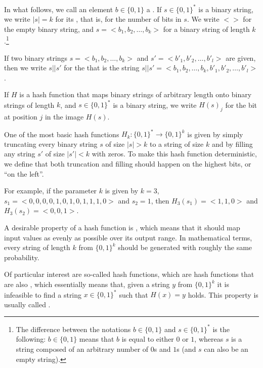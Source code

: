 \begin{notation}
\label{string_and_hash_notations}
In what follows, we call an element $b\in\{0,1\}$ a . If $s\in\{0,1\}^*$ is a binary string, we write $|s|=k$ for its , that is, for the number of bits in $s$. We write $<>$ for the empty binary string, and $s=<b_1,b_2,\ldots,b_k>$ for a binary string of length $k$.\footnote{The difference between the notations $b\in\{0,1\}$ and $s\in\{0,1\}^*$ is the following: $b\in\{0,1\}$ means that $b$ is equal to either $0$ or $1$, whereas $s$ is a string composed of an arbitrary number of $0$s and $1$s (and $s$ can also be an empty string).}

If two binary strings $s=<b_1,b_2,\ldots,b_k>$ and $s'=<b'_1,b'_2,\ldots,b'_l>$ are given, then we write $s||s'$ for the  that is the string 
$s||s'=<b_1,b_2,\ldots,b_k,b'_1,b'_2,\ldots,b'_l>$.

If $H$ is a hash function that maps binary strings of arbitrary length onto binary strings of length $k$, and $s\in\{0,1\}^*$ is a binary string, we write $H(s)_j$ for the bit at position $j$ in the image $H(s)$.
\end{notation}

\begin{example}\label{ex:k-truncation-hash} One of the most basic hash functions $H_k:\{0,1\}^*\to \{0,1\}^k$ is given by simply truncating every binary string $s$ of size $|s|> k$ to a string of size $k$ and by filling any string $s'$ of size $|s'|<k$ with zeros. To make this hash function deterministic, we define that both truncation and filling should happen on the highest bits, or ``on the left''.

For example, if the parameter $k$ is given by $k=3$, $s_1=<0,0,0,0,1,0,1,0,1,1,1,0>$ and $s_2=1$, then $H_3(s_1)=<1,1,0>$ and $H_3(s_2)=<0,0,1>$.
\end{example}

A desirable property of a hash function is , which means that it should map input values as evenly as possible over its output range. In mathematical terms, every string of length $k$  from $\{0,1\}^k$ should be generated with roughly the same probability.

Of particular interest are so-called  hash functions, which are hash functions that are also , which essentially means that, given a string $y$ from $\{0,1\}^k$ it is infeasible to find a string $x\in\{0,1\}^*$ such that $H(x)=y$ holds. This property is usually called .

